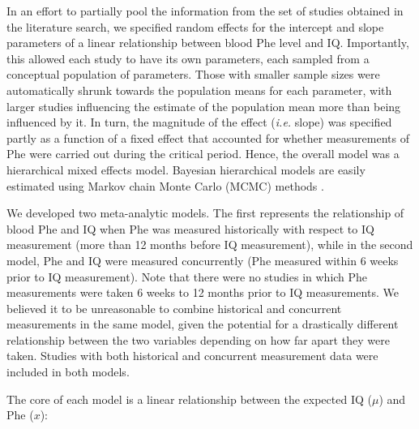 \documentclass{svjour3}                     %
\begin{document}

In an effort to partially pool the information from the set of studies obtained in the literature search, we specified random effects for the intercept and slope parameters of a linear relationship between blood Phe level and IQ. Importantly, this allowed each study to have its own parameters, each sampled from a conceptual population of parameters. Those with smaller sample sizes were automatically shrunk towards the population means for each parameter, with larger studies influencing the estimate of the population mean more than being influenced by it. In turn, the magnitude of the effect (\emph{i.e.} slope) was specified partly as a function of a fixed effect that accounted for whether measurements of Phe were carried out during the critical period. Hence, the overall model was a hierarchical mixed effects model. Bayesian hierarchical models are easily estimated using Markov chain Monte Carlo (MCMC) methods \citep{Brooks:2010vi}.

We developed two meta-analytic models. The first represents the relationship of blood Phe and IQ when Phe was measured historically with respect to IQ measurement (more than 12 months before IQ measurement), while in the second model, Phe and IQ were measured concurrently (Phe measured within 6 weeks prior to IQ measurement). Note that there were no studies in which Phe measurements were taken 6 weeks to 12 months prior to IQ measurements. We believed it to be unreasonable to combine historical and concurrent measurements in the same model, given the potential for a drastically different relationship between the two variables depending on how far apart they were taken. Studies with both historical and concurrent measurement data were included in both models.

The core of each model is a linear relationship between the expected IQ ($\mu$) and Phe ($x$):
\end{document}
